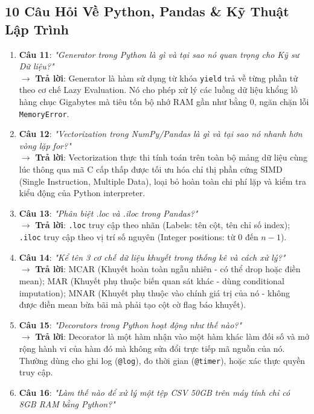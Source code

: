 \subsection{10 Câu Hỏi Về Python, Pandas \& Kỹ Thuật Lập Trình}
\begin{enumerate}
    \item \textbf{Câu 11}: \textit{"Generator trong Python là gì và tại sao nó quan trọng cho Kỹ sư Dữ liệu?"} \\
    $\rightarrow$ \textbf{Trả lời}: Generator là hàm sử dụng từ khóa \texttt{yield} trả về từng phần tử theo cơ chế Lazy Evaluation. Nó cho phép xử lý các luồng dữ liệu khổng lồ hàng chục Gigabytes mà tiêu tốn bộ nhớ RAM gần như bằng 0, ngăn chặn lỗi \texttt{MemoryError}.
    \item \textbf{Câu 12}: \textit{"Vectorization trong NumPy/Pandas là gì và tại sao nó nhanh hơn vòng lặp for?"} \\
    $\rightarrow$ \textbf{Trả lời}: Vectorization thực thi tính toán trên toàn bộ mảng dữ liệu cùng lúc thông qua mã C cấp thấp được tối ưu hóa chỉ thị phần cứng SIMD (Single Instruction, Multiple Data), loại bỏ hoàn toàn chi phí lặp và kiểm tra kiểu động của Python interpreter.
    \item \textbf{Câu 13}: \textit{"Phân biệt .loc và .iloc trong Pandas?"} \\
    $\rightarrow$ \textbf{Trả lời}: \texttt{.loc} truy cập theo nhãn (Labels: tên cột, tên chỉ số index); \texttt{.iloc} truy cập theo vị trí số nguyên (Integer positions: từ $0$ đến $n-1$).
    \item \textbf{Câu 14}: \textit{"Kể tên 3 cơ chế dữ liệu khuyết trong thống kê và cách xử lý?"} \\
    $\rightarrow$ \textbf{Trả lời}: MCAR (Khuyết hoàn toàn ngẫu nhiên - có thể drop hoặc điền mean); MAR (Khuyết phụ thuộc biến quan sát khác - dùng conditional imputation); MNAR (Khuyết phụ thuộc vào chính giá trị của nó - không được điền mean bừa bãi mà phải tạo cột cờ flag báo khuyết).
    \item \textbf{Câu 15}: \textit{"Decorators trong Python hoạt động như thế nào?"} \\
    $\rightarrow$ \textbf{Trả lời}: Decorator là một hàm nhận vào một hàm khác làm đối số và mở rộng hành vi của hàm đó mà không sửa đổi trực tiếp mã nguồn của nó. Thường dùng cho ghi log (\texttt{@log}), đo thời gian (\texttt{@timer}), hoặc xác thực quyền truy cập.
    \item \textbf{Câu 16}: \textit{"Làm thế nào để xử lý một tệp CSV 50GB trên máy tính chỉ có 8GB RAM bằng Python?"} \\

\end{enumerate}
